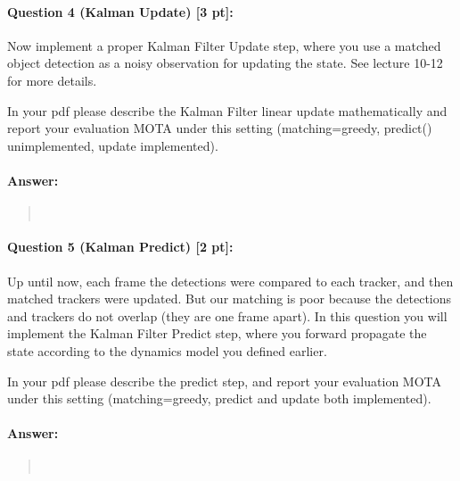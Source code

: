 \documentclass[11pt]{article}
\begin{document}
\paragraph{Question 4 (Kalman Update) [3 pt]:}
Now implement a proper Kalman Filter Update step, where you use a matched object detection as a noisy observation for updating the state. See lecture 10-12 for more details.

In your pdf please describe the Kalman Filter linear update mathematically and report your evaluation MOTA under this setting (matching=greedy, predict() unimplemented, update implemented).
\paragraph{Answer:} 
\begin{quote}



\begin{lstlisting}[language=Python, basicstyle=\scriptsize]



\end{lstlisting}



\end{quote}


\paragraph{Question 5 (Kalman Predict) [2 pt]:}
Up until now, each frame the detections were compared to each tracker, and then matched trackers were updated. But our matching is poor because the detections and trackers do not overlap (they are one frame apart). In this question you will implement the Kalman Filter Predict step, where you forward propagate the state according to the dynamics model you defined earlier.

In your pdf please describe the predict step, and report your evaluation MOTA under this setting (matching=greedy, predict and update both implemented).
\paragraph{Answer:} 
\begin{quote}



\begin{lstlisting}[language=Python, basicstyle=\scriptsize]



\end{lstlisting}



\end{quote}
\end{document}
